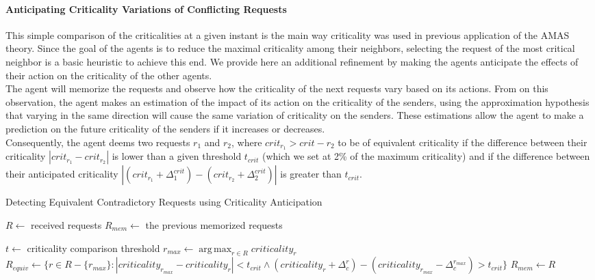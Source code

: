 \paragraph*{Anticipating Criticality Variations of Conflicting Requests}

This simple comparison of the criticalities at a given instant is the main way criticality was used in previous application of the AMAS theory. Since the goal of the agents is to reduce the maximal criticality among their neighbors, selecting the request of the most critical neighbor is a basic heuristic to achieve this end. We provide here an additional refinement by making the agents anticipate the effects of their action on the criticality of the other agents.\\
The agent will memorize the requests and observe how the criticality of the next requests vary based on its actions. From on this observation, the agent makes an estimation of the impact of its action on the criticality of the senders, using the approximation hypothesis that varying in the same direction will cause the same variation of criticality on the senders. These estimations allow the agent to make a prediction on the future criticality of the senders if it increases or decreases.\\
Consequently, the agent deems two requests $r_1$ and $r_2$, where $crit_{r_1} > crit-{r_2}$ to be of equivalent criticality if the difference between their criticality $|crit_{r_1} - crit_{r_2}|$ is lower than a given threshold $t_{crit}$ (which we set at 2\% of the maximum criticality) and if the difference between their anticipated criticality $| (crit_{r_1} + \Delta_1^{crit}) - (crit_{r_2} + \Delta_2^{crit})|$ is greater than $t_{crit}$.

\begin{algorithm}
\caption{Detecting Equivalent Contradictory Requests using Criticality Anticipation}
\label{algo_criticality_anticipation}
	$R \leftarrow $ received requests\;
	$R_{mem} \leftarrow $ the previous memorized requests\;
	
	$t \leftarrow$ criticality comparison threshold\;
	\BlankLine
	$r_{max} \leftarrow \displaystyle\operatorname*{arg\,max}_{r \in R}criticality_r$\;
	$R_{equiv} \leftarrow \{ r \in R-\{r_{max}\}: | criticality_{r_{max}} - criticality_{r} | < t_{crit} 		\wedge 	(criticality_{r} + \Delta_c^{r}) - (criticality_{r_{max}} - \Delta_c^{r_{max}}) > t_{crit}\} $\;
	\BlankLine
	$R_{mem} \leftarrow R$\;
\end{algorithm}


